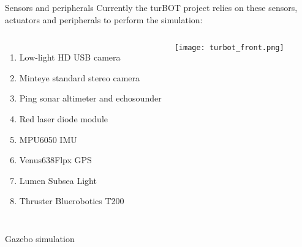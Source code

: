 \begin{frame}[c]{Sensors and peripherals}
  \transboxout[duration=0.5]
  Currently the turBOT project relies on these sensors, actuators and peripherals to perform the simulation:

  \begin{columns}
      \begin{enumerate}
        \item Low-light HD USB camera
        \item Minteye standard stereo camera
        \item Ping sonar altimeter and echosounder
        \item Red laser diode module
        \item MPU6050 IMU
        \item Venus638Flpx GPS
        \item Lumen Subsea Light
        \item Thruster Bluerobotics T200
      \end{enumerate}
      \texttt{[image: turbot\_front.png]}      
  \end{columns}
\end{frame}

\begin{frame}[c]{Gazebo simulation}
  \centering
\end{frame}

